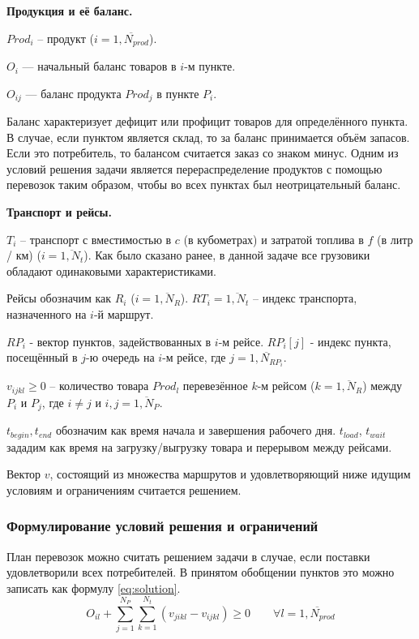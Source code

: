 	\textbf{Продукция и её баланс.}
	
	$Prod_i$ -- продукт ($i = \overline{1, N_{prod}}$).
	
	$O_i$ --- начальный баланс товаров в $i$-м пункте. 
	 
	$O_{ij}$ --- баланс продукта $Prod_j$ в пункте $P_i$.  
	
	Баланс характеризует дефицит или профицит товаров для определённого пункта. В случае, если пунктом является склад, то за баланс принимается объём запасов. Если это потребитель, то балансом считается заказ со знаком минус. Одним из условий решения задачи является перераспределение продуктов с помощью перевозок таким образом, чтобы во всех пунктах был неотрицательный баланс. 
	
	\textbf{Транспорт и рейсы.}
	
	$T_i$ -- транспорт с вместимостью в $c$ (в кубометрах) и затратой топлива в $f$ (в литр / км) ($i = \overline{1, N_t}$). Как было сказано ранее, в данной задаче все грузовики обладают одинаковыми характеристиками.
	
	Рейсы обозначим как $R_i$ ($i = \overline{1, N_R}$). $RT_i = \overline{1, N_t}$ -- индекс транспорта, назначенного на $i$-й маршрут.
	
	$RP_i$ - вектор пунктов, задействованных в $i$-м рейсе. $RP_i[j]$ - индекс пункта, посещённый в $j$-ю очередь на $i$-м рейсе, где $j = \overline{1, N_{RP_i}}$.
	
	$v_{ijkl} \ge 0$ -- количество товара $Prod_l$ перевезённое $k$-м рейсом ($k = \overline{1, N_R}$) между $P_i$ и $P_j$, где $i \ne j$ и $i, j = \overline{1, N_P}$. 
	
	$t_{begin}, t_{end}$ обозначим как время начала и завершения рабочего дня. $t_{load}$, $t_{wait}$ зададим как время на загрузку/выгрузку товара и перерывом между рейсами.
	
	Вектор $v$, состоящий из множества маршрутов и удовлетворяющий ниже идущим условиям и ограничениям считается решением.
	
	\subsubsection{Формулирование условий решения и ограничений}    
	План перевозок можно считать решением задачи в случае, если поставки удовлетворили всех потребителей. В принятом обобщении пунктов это можно записать как формулу \ref{eq:solution}.
	\begin{equation}
		\label{eq:solution}
		O_{il} + \sum_{j=1}^{N_P} \sum_{k=1}^{N_t} (v_{jikl} - v_{ijkl}) \ge 0 \qquad  \forall l = \overline{1, N_{prod}}
	\end{equation}
	   

